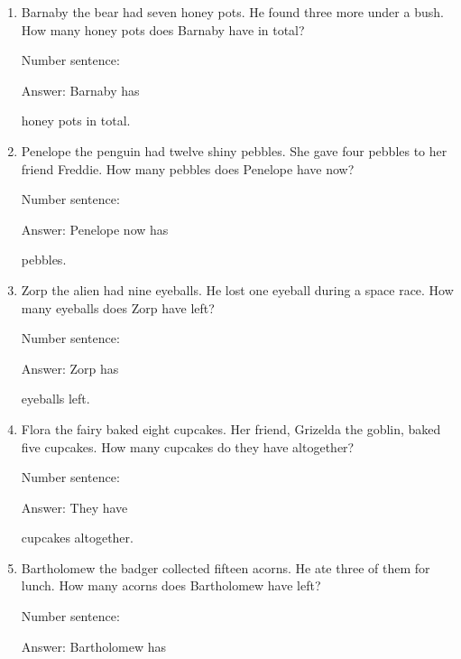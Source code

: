 \documentclass{tufte-book}
\begin{document}
\begin{enumerate}

\item
  Barnaby the bear had seven honey pots. He found three more under a
  bush. How many honey pots does Barnaby have in total?\medskip\par
  Number sentence:
  \dotfill\medskip\par
  Answer: Barnaby has
  \dotfill\medskip\par\mbox{}\dotfill\medskip\par\mbox{}\dotfill\bigskip
  honey pots in total.
\item
  Penelope the penguin had twelve shiny pebbles. She gave four pebbles
  to her friend Freddie. How many pebbles does Penelope have now?\medskip\par
  Number sentence:
  \dotfill\medskip\par
  Answer: Penelope now has
  \dotfill\medskip\par\mbox{}\dotfill\medskip\par\mbox{}\dotfill\bigskip
  pebbles.
\item
  Zorp the alien had nine eyeballs. He lost one eyeball during a space
  race. How many eyeballs does Zorp have left?\medskip\par
  Number sentence:
  \dotfill\medskip\par
  Answer: Zorp has
  \dotfill\medskip\par\mbox{}\dotfill\medskip\par\mbox{}\dotfill\bigskip
  eyeballs left.
\item
  Flora the fairy baked eight cupcakes. Her friend, Grizelda the goblin,
  baked five cupcakes. How many cupcakes do they have altogether?\medskip\par
  Number sentence:
  \dotfill\medskip\par
  Answer: They have
  \dotfill\medskip\par\mbox{}\dotfill\medskip\par\mbox{}\dotfill\bigskip
  cupcakes altogether.
\item
  Bartholomew the badger collected fifteen acorns. He ate three of them
  for lunch. How many acorns does Bartholomew have left?\medskip\par
  Number sentence:
  \dotfill\medskip\par
  Answer: Bartholomew has
  \dotfill\medskip\par\mbox{}\dotfill\medskip\par\mbox{}\dotfill\bigskip

\end{enumerate}
\end{document}
